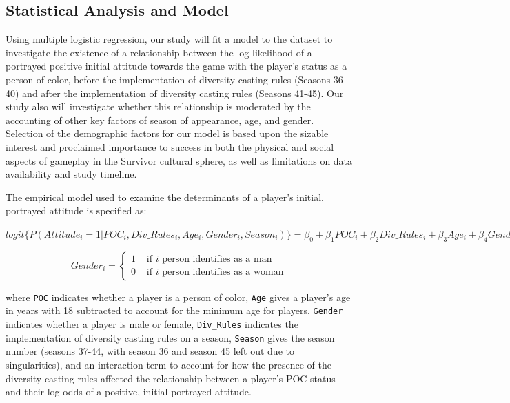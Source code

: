 \documentclass[
  letterpaper,
  DIV=11,
  numbers=noendperiod,
  oneside]{scrartcl}
\begin{document}
\hypertarget{statistical-analysis-and-model}{%
\subsection{Statistical Analysis and
Model}\label{statistical-analysis-and-model}}

Using multiple logistic regression, our study will fit a model to the
dataset to investigate the existence of a relationship between the
log-likelihood of a portrayed positive initial attitude towards the game
with the player's status as a person of color, before the implementation
of diversity casting rules (Seasons 36-40) and after the implementation
of diversity casting rules (Seasons 41-45). Our study also will
investigate whether this relationship is moderated by the accounting of
other key factors of season of appearance, age, and gender. Selection of
the demographic factors for our model is based upon the sizable interest
and proclaimed importance to success in both the physical and social
aspects of gameplay in the Survivor cultural sphere, as well as
limitations on data availability and study timeline.

The empirical model used to examine the determinants of a player's
initial, portrayed attitude is specified as:

\(logit \{P(Attitude_i=1|POC_i,Div\_Rules_i,Age_i,Gender_i,Season_i)\} = \beta_0 + \beta_1POC_i + \beta_2Div\_Rules_i + \beta_3Age_i+ \beta_4Gender_i + \beta_{5-13}Season_i + \beta_{14}POC_i*Div\_Rules_i\)

\begin{equation} Gender_i = \begin{cases} 1 & \text{ if } i \text{ person identifies as a man} \\ 0 & \text{ if } i \text{ person identifies as a woman} \end{cases} \end{equation}

where \texttt{POC} indicates whether a player is a person of color,
\texttt{Age} gives a player's age in years with 18 subtracted to account
for the minimum age for players, \texttt{Gender} indicates whether a
player is male or female, \texttt{Div\_Rules} indicates the
implementation of diversity casting rules on a season, \texttt{Season}
gives the season number (seasons 37-44, with season 36 and season 45
left out due to singularities), and an interaction term to account for
how the presence of the diversity casting rules affected the
relationship between a player's POC status and their log odds of a
positive, initial portrayed attitude.
\end{document}
